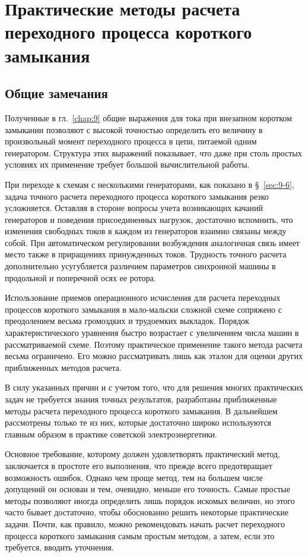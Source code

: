 \chapter{Практические методы расчета переходного процесса короткого замыкания}
\label{chap:10}

\section{Общие замечания}
\label{sec:10-1}

Полученные в гл.~\ref{chap:9} общие выражения для тока при внезапном коротком замыкании позволяют с высокой точностью определить его величину в произвольный момент переходного процесса в цепи, питаемой одним генератором. Структура этих выражений показывает, что даже при столь простых условиях их применение требует большой вычислительной работы.

При переходе к схемам с несколькими генераторами, как показано в §~\ref{sec:9-6}, задача точного расчета переходного процесса короткого замыкания резко усложняется. Оставляя в стороне вопросы учета возникающих качаний генераторов и поведения присоединенных нагрузок, достаточно вспомнить, что изменения свободных токов в каждом из генераторов взаимно связаны между собой. При автоматическом регулировании возбуждения аналогичная связь имеет место также в приращениях принужденных токов. Трудность точного расчета дополнительно усугубляется различием параметров синхронной машины в продольной и поперечной осях ее ротора.

Использование приемов операционного исчисления для расчета переходных процессов короткого замыкания в мало-мальски сложной схеме сопряжено с преодолением весьма громоздких и трудоемких выкладок. Порядок характеристического уравнения быстро возрастает с увеличением числа машин в рассматриваемой схеме. Поэтому практическое применение такого метода расчета весьма ограничено. Его можно рассматривать лишь как эталон для оценки других приближенных методов расчета.

В силу указанных причин и с учетом того, что для решения многих практических задач не требуется знания точных результатов, разработаны приближенные методы расчета переходного процесса короткого замыкания. В дальнейшем рассмотрены только те из них, которые достаточно широко используются главным образом в практике советской электроэнергетики.

Основное требование, которому должен удовлетворять практический метод, заключается в простоте его выполнения, что прежде всего предотвращает возможность ошибок. Однако чем проще метод, тем на большем числе допущений он основан и тем, очевидно, меньше его точность. Самые простые методы позволяют иногда определить лишь порядок искомых величин, но этого часто бывает достаточно, чтобы обоснованно решить некоторые практические задачи. Почти, как правило, можно рекомендовать начать расчет переходного процесса короткого замыкания самым простым методом, а затем, если это требуется, вводить уточнения.

